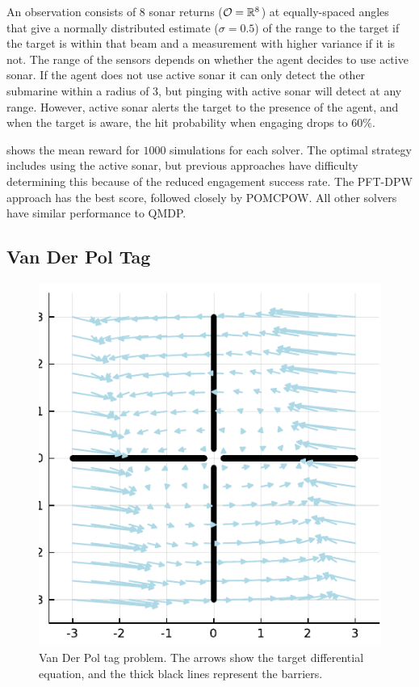 An observation consists of 8 sonar returns ($\mathcal{O} = \mathbb{R}^8$) at equally-spaced angles that give a normally distributed estimate ($\sigma=0.5$) of the range to the target if the target is within that beam and a measurement with higher variance if it is not.
The range of the sensors depends on whether the agent decides to use active sonar.
If the agent does not use active sonar it can only detect the other submarine within a radius of 3, but pinging with active sonar will detect at any range.
However, active sonar alerts the target to the presence of the agent, and when the target is aware, the hit probability when engaging drops to $60\%$.

 shows the mean reward for $1000$ simulations for each solver.
The optimal strategy includes using the active sonar, but previous approaches have difficulty determining this because of the reduced engagement success rate.
The PFT-DPW approach has the best score, followed closely by POMCPOW.
All other solvers have similar performance to QMDP.


\subsection{Van Der Pol Tag} \label{sec:vdptag}

\begin{figure}[bth]
    \centering
    \begin{minipage}{0.5\linewidth}
        \centering
        \includegraphics[width=0.8\linewidth]{media/vdp_quiver.pdf}
    \end{minipage}
    \hfill
    \begin{minipage}[c]{0.45\linewidth}
        \caption{Van Der Pol tag problem. The arrows show the target differential equation, and the thick black lines represent the barriers.}
        \label{fig:vdp}
    \end{minipage}
\end{figure}


